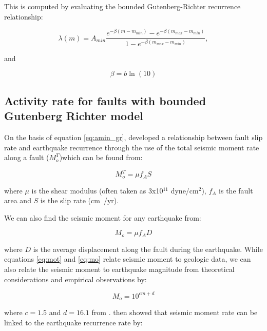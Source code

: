 \begin{enumerate}
This is computed by evaluating the bounded Gutenberg-Richter recurrence relationship:

\begin{equation} \label{eq:amin_gr}
\lambda(m) =
A_{min}\frac{e^{-\beta(m-m_{min})}-e^{-\beta(m_{max}-m_{min})}}{1-e^{-\beta(m_{max}-m_{min})}},
\end{equation}

\citet{dr_kramer96a} and 

\begin{equation}
\beta = b\ln(10)
\end{equation}



\subsection{Activity rate for faults with bounded Gutenberg Richter model}
\label{sec:rv_flt_GR}
On the basis of equation \ref{eq:amin_gr}, \citet{eqrm_Youngs85} developed a relationship between fault slip 
rate and earthquake recurrence through the use of the total seismic moment rate along a fault ($M_o^T$)which can be found from:

\begin{equation} \label{eq:mot}
M_o^T = \mu f_A S
\end{equation}

where $\mu$ is the shear modulus (often taken as 3x10$^{11}$ dyne/cm$^2$), $f_A$ is the fault area and $S$ is the slip rate (cm~/yr). 

We can also find the seismic moment for any earthquake from:

\begin{equation} \label{eq:mo}
M_o = \mu f_A D
\end{equation}

where $D$ is the average displacement along the fault during the earthquake. While equations \ref{eq:mot} and \ref{eq:mo} relate 
seismic moment to geologic data, we can also relate the seismic moment to earthquake magnitude from theoretical considerations and 
empirical observations by:

\begin{equation} \label{eq:mo_mag}
M_o = 10^{cm+d}
\end{equation}

where $c=1.5$ and $d=16.1$ from \citet{eqrm_Hanks1979}. \citet{eqrm_Youngs1985} then showed that seismic 
moment rate can be linked to the earthquake recurrence rate by:


\end{enumerate}
